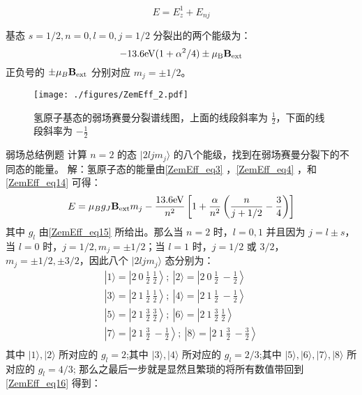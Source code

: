 \begin{equation}\label{ZemEff_eq14}
E=E_z^1+E_{nj}
\end{equation}
\begin{example}{}
基态 $s=1/2,n=0,l=0,j=1/2$ 分裂出的两个能级为：
\begin{equation}\label{ZemEff_eq16}
-13.6\rm{eV}(1+\alpha^2/4)\pm\mu_B\mathbf{B}_{\rm{ext}}\notag
\end{equation}
正负号的 $\pm\mu_B\mathbf{B}_{\rm{ext}}$ 分别对应 $m_j=\pm1/2$。\begin{figure}[ht]
\centering
\texttt{[image: ./figures/ZemEff\_2.pdf]}
\caption{氢原子基态的弱场赛曼分裂谱线图，上面的线段斜率为 $\frac{1}{2}$，下面的线段斜率为 $-\frac{1}{2}$} \label{ZemEff_fig2}
\end{figure}
\end{example}
\begin{example}{弱场总结例题}
计算 $n=2$ 的态 $|2ljm_j\rangle$ 的八个能级，找到在弱场赛曼分裂下的不同态的能量。
解：氢原子态的能量由\autoref{ZemEff_eq3} ，\autoref{ZemEff_eq4} ，和\autoref{ZemEff_eq14} 可得：
\begin{equation}
E=\mu_Bg_J\mathbf{B}_{\rm{ext}}m_j-\frac{13.6\rm{eV}}{n^2}\left[1+\frac{\alpha}{n^2}\left(\frac{n}{j+1/2}-\frac{3}{4}\right)\right]
\end{equation}
其中 $g_l$ 由\autoref{ZemEff_eq15} 所给出。那么当 $n=2$ 时，$l=0,1$ 并且因为 $j=l\pm s$，当 $l=0$ 时，$j=1/2,m_j=\pm 1/2$；当 $l=1$ 时，$j=1/2$ 或 $3/2$，$m_j=\pm 1/2,\pm 3/2$，因此八个 $|2ljm_j\rangle$ 态分别为：
\begin{align}
|1\rangle =\left|2 \ 0 \ \frac{1}{2} \ \frac{1}{2}\right\rangle;\ 
|2\rangle =\left|2 \ 0 \ \frac{1}{2} \ -\frac{1}{2}\right\rangle\\
|3\rangle =\left|2 \ 1 \ \frac{1}{2} \ \frac{1}{2}\right\rangle;\ 
|4\rangle =\left|2 \ 1 \ \frac{1}{2} \ -\frac{1}{2}\right\rangle\\
|5\rangle =\left|2 \ 1 \ \frac{3}{2} \ \frac{3}{2}\right\rangle;\ 
|6\rangle =\left|2 \ 1 \ \frac{3}{2} \ \frac{1}{2}\right\rangle\\
|7\rangle =\left|2 \ 1 \ \frac{3}{2} \ -\frac{1}{2}\right\rangle;\ 
|8\rangle =\left|2 \ 1 \ \frac{3}{2} \ -\frac{3}{2}\right\rangle\\
\end{align}
其中 $|1\rangle,|2\rangle$ 所对应的 $g_l=2$;其中 $|3\rangle,|4\rangle$ 所对应的 $g_l=2/3$;其中 $|5\rangle,|6\rangle,|7\rangle,|8\rangle$ 所对应的 $g_l=4/3$;
那么之最后一步就是显然且繁琐的将所有数值带回到\autoref{ZemEff_eq16} 得到：

\end{example}
